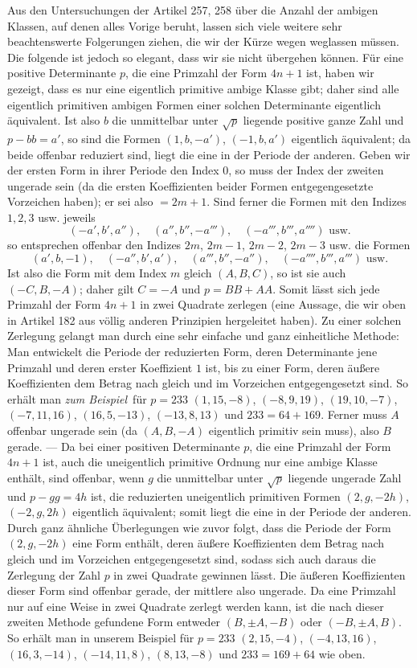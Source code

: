 Aus den Untersuchungen der Artikel 257, 258 über die Anzahl der ambigen Klassen, auf denen alles Vorige beruht, lassen sich viele weitere sehr beachtenswerte Folgerungen ziehen, die wir der Kürze wegen weglassen müssen. Die folgende ist jedoch so elegant, dass wir sie nicht übergehen können. Für eine positive Determinante $p$, die eine Primzahl der Form $4n+1$ ist, haben wir gezeigt, dass es nur eine eigentlich primitive ambige Klasse gibt; daher sind alle eigentlich primitiven ambigen Formen einer solchen Determinante eigentlich äquivalent. Ist also $b$ die unmittelbar unter $\surd p$ liegende positive ganze Zahl und $p-bb
=a'$, so sind die Formen $(1, b, -a')$, $(-1, b, a')$ eigentlich äquivalent; da beide offenbar reduziert sind, liegt die eine in der Periode der anderen. Geben wir der ersten Form in ihrer Periode den Index $0$, so muss der Index der zweiten ungerade sein (da die ersten Koeffizienten beider Formen entgegengesetzte Vorzeichen haben); er sei also $=2m+1$. Sind ferner die Formen mit den Indizes $1, 2, 3$ usw. jeweils
\[
(-a', b', a''),\quad (a'', b'', -a'''),\quad (-a''', b''', a'''')\text{ usw.}
\]
so entsprechen offenbar den Indizes $2m$, $2m-1$, $2m-2$, $2m-3$ usw. die Formen
\[
(a', b, -1),\quad (-a'', b', a'),\quad (a''', b'', -a''),\quad (-a'''', b''', a''')\text{ usw.}
\]
Ist also die Form mit dem Index $m$ gleich $(A, B, C)$, so ist sie auch $(-C, B, -A)$; daher gilt $C=-A$ und $p=BB+AA$. Somit lässt sich jede Primzahl der Form $4n+1$ in zwei Quadrate zerlegen (eine Aussage, die wir oben in Artikel 182 aus völlig anderen Prinzipien hergeleitet haben). Zu einer solchen Zerlegung gelangt man durch eine sehr einfache und ganz einheitliche Methode: Man entwickelt die Periode der reduzierten Form, deren Determinante jene Primzahl und deren erster Koeffizient $1$ ist, bis zu einer Form, deren äußere Koeffizienten dem Betrag nach gleich und im Vorzeichen entgegengesetzt sind. So erhält man \textit{zum Beispiel}\ für $p=233$ $(1, 15, -8)$, $(-8, 9, 19)$, $(19, 10, -7)$, $(-7, 11, 16)$, $(16, 5, -13)$, $(-13, 8, 13)$ und $233=64+169$. Ferner muss $A$ offenbar ungerade sein (da $(A, B, -A)$ eigentlich primitiv sein muss), also $B$ gerade. --- Da bei einer positiven Determinante $p$, die eine Primzahl der Form $4n+1$ ist, auch die uneigentlich primitive Ordnung nur eine ambige Klasse enthält, sind offenbar, wenn $g$ die
unmittelbar unter $\surd p$ liegende ungerade Zahl und $p-gg=4h$ ist, die reduzierten uneigentlich primitiven Formen $(2, g, -2h)$, $(-2, g, 2h)$ eigentlich äquivalent; somit liegt die eine in der Periode der anderen. Durch ganz ähnliche Überlegungen wie zuvor folgt, dass die Periode der Form $(2, g, -2h)$ eine Form enthält, deren äußere Koeffizienten dem Betrag nach gleich und im Vorzeichen entgegengesetzt sind, sodass sich auch daraus die Zerlegung der Zahl $p$ in zwei Quadrate gewinnen lässt. Die äußeren Koeffizienten dieser Form sind offenbar gerade, der mittlere also ungerade. Da eine Primzahl nur auf eine Weise in zwei Quadrate zerlegt werden kann, ist die nach dieser zweiten Methode gefundene Form entweder $(B, \pm A, -B)$ oder $(-B, \pm A, B)$. So erhält man in unserem Beispiel für $p=233$ $(2, 15, -4)$, $(-4, 13, 16)$, $(16, 3, -14)$, $(-14, 11, 8)$, $(8, 13, -8)$ und $233=169+64$ wie oben.
